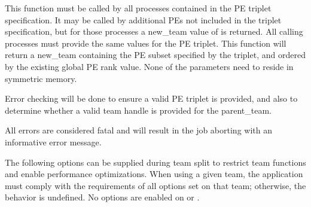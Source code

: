 \begin{apidefinition}
{This function must be called by all processes contained in the \ac{PE} triplet
specification. It may be called by additional \acp{PE} not included in the
triplet specification, but for those processes a new\_team value of
 is returned. All calling processes must provide the
same values for the \ac{PE} triplet. This function will return a new\_team
containing the \ac{PE} subset specified by the triplet, and ordered by the
existing global \ac{PE} rank value. None of the parameters need to reside in
symmetric memory.

Error checking will be done to ensure a valid \ac{PE} triplet is provided,
and also to determine whether a valid team handle is provided for the
parent\_team.

All errors are considered fatal and will result in the job aborting with
an informative error message.

The following options can be supplied during team split to restrict
team functions and enable performance optimizations.  When using a given
team, the application must comply with the requirements of all options
set on that team; otherwise, the behavior is undefined.
No options are enabled on  or .

}



\begin{apiexamples}

\end{apiexamples}

\end{apidefinition}
